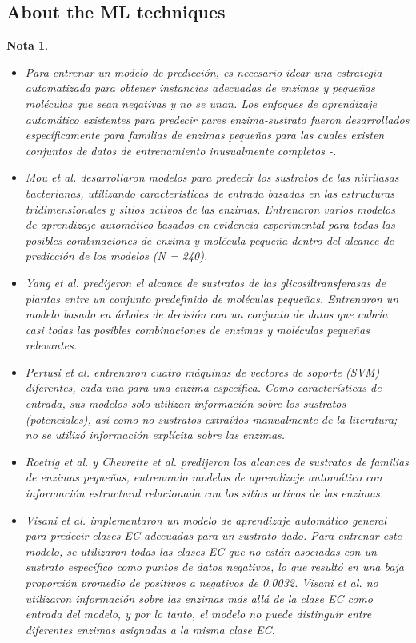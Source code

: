 \documentclass[12pt]{article}
\newtheorem{Note}{Nota}%
\begin{document}
\subsection{About the ML techniques}

\begin{Note}
\begin{itemize}
\item Para entrenar un modelo de predicción, es necesario idear una estrategia automatizada para obtener instancias adecuadas de enzimas y pequeñas moléculas que sean negativas y no se unan. Los enfoques de aprendizaje automático existentes para predecir pares enzima-sustrato fueron desarrollados específicamente para familias de enzimas pequeñas para las cuales existen conjuntos de datos de entrenamiento inusualmente completos \cite{2.13}-\cite{2.18}.

\item Mou et al.\cite{2.14} desarrollaron modelos para predecir los sustratos de las nitrilasas bacterianas, utilizando características de entrada basadas en las estructuras tridimensionales y sitios activos de las enzimas. Entrenaron varios modelos de aprendizaje automático basados en evidencia experimental para todas las posibles combinaciones de enzima y molécula pequeña dentro del alcance de predicción de los modelos (N = 240). 


\item Yang et al.\cite{2.15} predijeron el alcance de sustratos de las glicosiltransferasas de plantas entre un conjunto predefinido de moléculas pequeñas. Entrenaron un modelo basado en árboles de decisión con un conjunto de datos que cubría casi todas las posibles combinaciones de enzimas y moléculas pequeñas relevantes. 


\item Pertusi et al.\cite{2.13} entrenaron cuatro máquinas de vectores de soporte (SVM) diferentes, cada una para una enzima específica. Como características de entrada, sus modelos solo utilizan información sobre los sustratos (potenciales), así como no sustratos extraídos manualmente de la literatura; no se utilizó información explícita sobre las enzimas.


\item Roettig et al.\cite{2.16} y Chevrette et al.\cite{2.17} predijeron los alcances de sustratos de familias de enzimas pequeñas, entrenando modelos de aprendizaje automático con información estructural relacionada con los sitios activos de las enzimas. 


\item Visani et al.\cite{2.19} implementaron un modelo de aprendizaje automático general para predecir clases EC adecuadas para un sustrato dado. Para entrenar este modelo, se utilizaron todas las clases EC que no están asociadas con un sustrato específico como puntos de datos negativos, lo que resultó en una baja proporción promedio de positivos a negativos de 0.0032. Visani et al. no utilizaron información sobre las enzimas más allá de la clase EC como entrada del modelo, y por lo tanto, el modelo no puede distinguir entre diferentes enzimas asignadas a la misma clase EC.


\end{itemize}
\end{Note}
\end{document}
